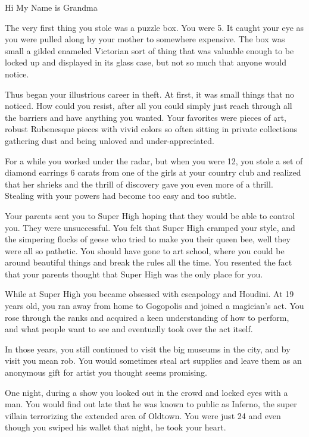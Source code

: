 \documentclass[char]{LRSguildcamp1}
\begin{document}
\name{\cGrandma{}}
Hi My Name is Grandma

The very first thing you stole was a puzzle box. You were 5. It caught your eye as you were pulled along by your mother to somewhere expensive. The box was small a gilded enameled Victorian sort of thing that was valuable enough to be locked up and displayed in its glass case, but not so much that anyone would notice. 

Thus began your illustrious career in theft. At first, it was small things that no noticed. How could you resist, after all you could simply just reach through all the barriers and have anything you wanted. Your favorites were pieces of art, robust Rubenesque pieces with vivid colors so often sitting in private collections gathering dust and being unloved and under-appreciated. 

For a while you worked under the radar,  but when you were 12, you stole a set of diamond earrings 6 carats from one of the girls at your country club and realized that her shrieks and the thrill of discovery gave you even more of a thrill. Stealing with your powers had become too easy and too subtle. 

Your parents sent you to Super High hoping that they would be able to control you. They were unsuccessful. You felt that Super High cramped your style, and the simpering flocks of geese who tried to make you their queen bee, well they were all so pathetic. You should have gone to art school, where you could be around beautiful things and break the rules all the time. You resented the fact that your parents thought that Super High was the only place for you. 

While at Super High you became obsessed with escapology and Houdini. At 19 years old, you ran away from home to Gogopolis and joined a magician’s act. You rose through the ranks and acquired a keen understanding of how to perform, and what people want to see and eventually took over the act itself.  

In those years, you still continued to visit the big museums in the city, and by visit you mean rob. You would sometimes steal art supplies and leave them as an anonymous gift for artist you thought seems promising. 

One night, during a show you looked out in the crowd and locked eyes with a man. You would find out late that he was known to public as Inferno, the super villain terrorizing the extended area of Oldtown. You were just 24 and even though you swiped his wallet that night, he took your heart.
\end{document}

